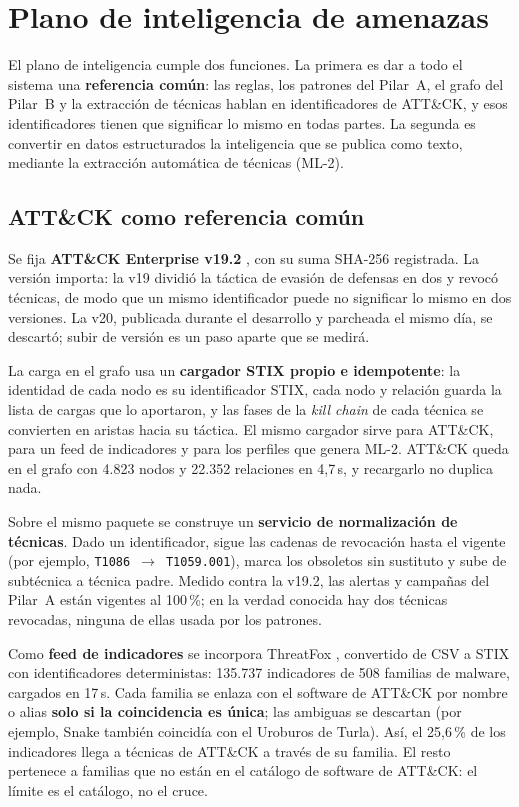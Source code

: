 \section{Plano de inteligencia de amenazas}
\label{sec:cti-impl}

El plano de inteligencia cumple dos funciones. La primera es dar a todo el sistema una
\textbf{referencia común}: las reglas, los patrones del Pilar~A, el grafo del Pilar~B y la
extracción de técnicas hablan en identificadores de ATT\&CK, y esos identificadores tienen que
significar lo mismo en todas partes. La segunda es convertir en datos estructurados la
inteligencia que se publica como texto, mediante la extracción automática de técnicas (ML-2).

\subsection{ATT\&CK como referencia común}

Se fija \textbf{ATT\&CK Enterprise v19.2} \cite{mitre_attack}, con su suma SHA-256 registrada. La
versión importa: la v19 dividió la táctica de evasión de defensas en dos y revocó técnicas, de
modo que un mismo identificador puede no significar lo mismo en dos versiones. La v20, publicada
durante el desarrollo y parcheada el mismo día, se descartó; subir de versión es un paso aparte
que se medirá.

La carga en el grafo usa un \textbf{cargador STIX propio e idempotente}: la identidad de cada nodo
es su identificador STIX, cada nodo y relación guarda la lista de cargas que lo aportaron, y las
fases de la \textit{kill chain} de cada técnica se convierten en aristas hacia su táctica. El mismo
cargador sirve para ATT\&CK, para un feed de indicadores y para los perfiles que genera ML-2.
ATT\&CK queda en el grafo con 4.823 nodos y 22.352 relaciones en 4,7\,s, y recargarlo no
duplica nada.

Sobre el mismo paquete se construye un \textbf{servicio de normalización de técnicas}. Dado un
identificador, sigue las cadenas de revocación hasta el vigente (por ejemplo,
\texttt{T1086}~$\rightarrow$~\texttt{T1059.001}), marca los obsoletos sin sustituto y sube de
subtécnica a técnica padre. Medido contra la v19.2, las alertas y campañas del Pilar~A están
vigentes al 100\,\%; en la verdad conocida hay dos técnicas revocadas, ninguna de ellas usada por
los patrones.

Como \textbf{feed de indicadores} se incorpora ThreatFox \cite{threatfox}, convertido de CSV a STIX
con identificadores deterministas: 135.737 indicadores de 508 familias de malware, cargados en
17\,s. Cada familia se enlaza con el software de ATT\&CK por nombre o alias \textbf{solo si la
coincidencia es única}; las ambiguas se descartan (por ejemplo, Snake también coincidía con el
Uroburos de Turla). Así, el 25,6\,\% de los indicadores llega a técnicas de ATT\&CK a través de su
familia. El resto pertenece a familias que no están en el catálogo de software de ATT\&CK: el
límite es el catálogo, no el cruce.

